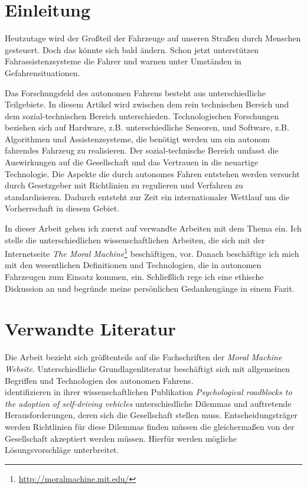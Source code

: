 \section{Einleitung}

Heutzutage wird der Großteil der Fahrzeuge auf unseren Straßen durch Menschen gesteuert. Doch das könnte sich bald ändern. Schon jetzt unterstützen Fahrassistenzsysteme die Fahrer und warnen unter Umständen in Gefahrensituationen.

Das Forschungsfeld des autonomen Fahrens besteht aus unterschiedliche Teilgebiete. In diesem Artikel wird  zwischen dem rein technischen Bereich und dem sozial-technischen Bereich unterschieden. Technologischen Forschungen beziehen sich auf Hardware, z.B. unterschiedliche Sensoren, und Software, z.B. Algorithmen und Assistenzsysteme, die benötigt werden um ein autonom fahrendes Fahrzeug zu realisieren. Der sozial-technische Bereich umfasst die Auswirkungen auf die Gesellschaft und das Vertrauen in die neuartige Technologie. Die Aspekte die durch autonomes Fahren entstehen werden versucht durch Gesetzgeber mit Richtlinien zu regulieren und Verfahren zu standardisieren. Dadurch entsteht zur Zeit ein internationaler Wettlauf um die Vorherrschaft in diesem Gebiet.

In dieser Arbeit gehen ich zuerst auf verwandte Arbeiten mit dem Thema ein. Ich stelle die unterschiedlichen wissenschaftlichen Arbeiten, die sich mit der Internetseite \textit{The Moral Machine}\footnote{\url{http://moralmachine.mit.edu/}} beschäftigen, vor. Danach beschäftige ich mich mit den wesentlichen Definitionen und Technologien, die in autonomen Fahrzeugen zum Einsatz kommen, ein. Schließlich rege ich eine ethische Diskussion an und begründe meine persönlichen Gedankengänge in einem Fazit.

\section{Verwandte Literatur}
Die Arbeit bezieht sich größtenteils auf die Fachschriften der \textit{Moral Machine Website}. Unterschiedliche Grundlagenliteratur beschäftigt sich mit allgemeinen Begriffen und Technologien des autonomen Fahrens.\\

\citeauthor{roadblocks} identifizieren in ihrer wissenschaftlichen Publikation \textit{Psychological roadblocks to the adoption of self-driving vehicles} \cite{roadblocks} unterschiedliche Dilemmas und auftretende Herausforderungen, deren sich die Gesellschaft stellen muss. Entscheidungsträger werden Richtlinien für diese Dilemmas finden müssen die gleichermaßen von der Gesellschaft akzeptiert werden müssen. Hierfür werden mögliche Lösungsvorschläge unterbreitet. 

